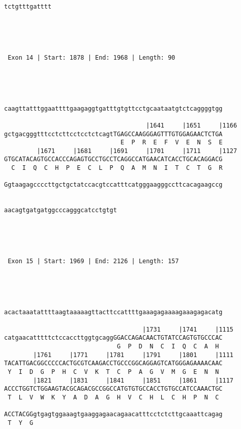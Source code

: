 \documentclass{article}
\begin{document}
\begin{Verbatim}
             
tctgtttgatttt
             




 Exon 14 | Start: 1878 | End: 1968 | Length: 90 




                                                            
caagttatttggaattttgaagaggtgatttgtgttcctgcaataatgtctcaggggtgg
                                                            
                                       |1641     |1651     |1166
gctgacgggtttcctcttcctcctctcagtTGAGCCAAGGGAGTTTGTGGAGAACTCTGA
                                E  P  R  E  F  V  E  N  S  E
         |1671     |1681     |1691     |1701     |1711     |1127
GTGCATACAGTGCCACCCAGAGTGCCTGCCTCAGGCCATGAACATCACCTGCACAGGACG
  C  I  Q  C  H  P  E  C  L  P  Q  A  M  N  I  T  C  T  G  R
                                                            
Ggtaagagccccttgctgctatccacgtccatttcatgggaagggccttcacagaagccg
                                                            
                               
aacagtgatgatggcccagggcatcctgtgt
                               




 Exon 15 | Start: 1969 | End: 2126 | Length: 157 




                                                            
acactaaatattttaagtaaaaagttacttccattttgaaagagaaaagaaagagacatg
                                                            
                                      |1731     |1741     |1115
catgaacatttttctccaccttggtgcaggGGACCAGACAACTGTATCCAGTGTGCCCAC
                               G  P  D  N  C  I  Q  C  A  H 
        |1761     |1771     |1781     |1791     |1801     |1111
TACATTGACGGCCCCCACTGCGTCAAGACCTGCCCGGCAGGAGTCATGGGAGAAAACAAC
 Y  I  D  G  P  H  C  V  K  T  C  P  A  G  V  M  G  E  N  N 
        |1821     |1831     |1841     |1851     |1861     |1117
ACCCTGGTCTGGAAGTACGCAGACGCCGGCCATGTGTGCCACCTGTGCCATCCAAACTGC
 T  L  V  W  K  Y  A  D  A  G  H  V  C  H  L  C  H  P  N  C 
                                                            
ACCTACGGgtgagtggaaagtgaaggagaacagaacatttcctctcttgcaaattcagag
 T  Y  G                                                    
                                      

\end{Verbatim}
\end{document}
